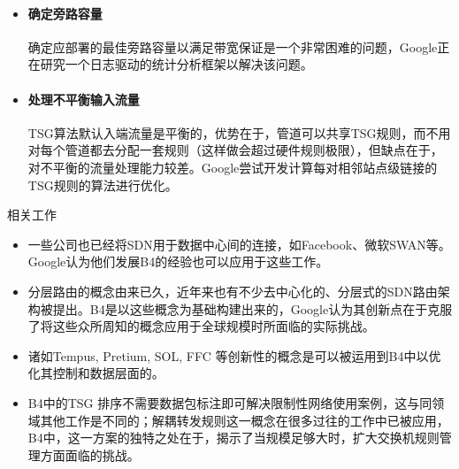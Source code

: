 \begin{frame}
    \begin{itemize}[<+->]
        \item \paragraph{确定旁路容量} 确定应部署的最佳旁路容量以满足带宽保证是一个非常困难的问题，Google正在研究一个日志驱动的统计分析框架以解决该问题。
        \item \paragraph{处理不平衡输入流量} TSG算法默认入端流量是平衡的，优势在于，管道可以共享TSG规则，而不用对每个管道都去分配一套规则（这样做会超过硬件规则极限），但缺点在于，对不平衡的流量处理能力较差。Google尝试开发计算每对相邻站点级链接的TSG规则的算法进行优化。
    \end{itemize}    
\end{frame}

\begin{frame}{相关工作}
    \begin{itemize}[<+->]
        \item {}  一些公司也已经将SDN用于数据中心间的连接，如Facebook、微软SWAN等。Google认为他们发展B4的经验也可以应用于这些工作。

        \item {} 分层路由的概念由来已久，近年来也有不少去中心化的、分层式的SDN路由架构被提出。B4是以这些概念为基础构建出来的，Google认为其创新点在于克服了将这些众所周知的概念应用于全球规模时所面临的实际挑战。

        \item {} 诸如Tempus, Pretium, SOL, FFC 等创新性的概念是可以被运用到B4中以优化其控制和数据层面的。

        \item {} B4中的TSG 排序不需要数据包标注即可解决限制性网络使用案例，这与同领域其他工作是不同的；解耦转发规则这一概念在很多过往的工作中已被应用，B4中，这一方案的独特之处在于，揭示了当规模足够大时，扩大交换机规则管理方面面临的挑战。
    \end{itemize}

\end{frame}

